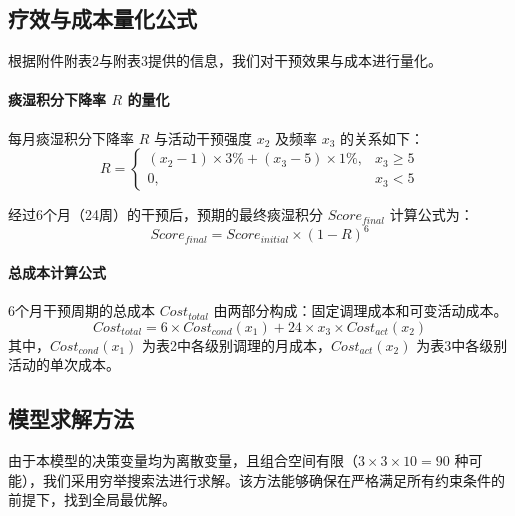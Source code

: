 \documentclass[12pt,a4paper]{article}
\begin{document}
\subsection{疗效与成本量化公式}
根据附件附表2与附表3提供的信息，我们对干预效果与成本进行量化。

\paragraph{痰湿积分下降率 $R$ 的量化}
每月痰湿积分下降率 $R$ 与活动干预强度 $x_2$ 及频率 $x_3$ 的关系如下：
\begin{equation}
R =
\begin{cases}
 (x_2 - 1) \times 3\% + (x_3 - 5) \times 1\%, & x_3 \ge 5 \\
0, & x_3 < 5
\end{cases}
\end{equation}

经过6个月（24周）的干预后，预期的最终痰湿积分 $Score_{final}$ 计算公式为：
\begin{equation}
Score_{final} = Score_{initial} \times (1 - R)^6
\end{equation}

\paragraph{总成本计算公式}
6个月干预周期的总成本 $Cost_{total}$ 由两部分构成：固定调理成本和可变活动成本。
\begin{equation}
Cost_{total} = 6 \times Cost_{cond}(x_1) + 24 \times x_3 \times Cost_{act}(x_2)
\end{equation}
其中，$Cost_{cond}(x_1)$ 为表2中各级别调理的月成本，$Cost_{act}(x_2)$ 为表3中各级别活动的单次成本。

\subsection{模型求解方法}
由于本模型的决策变量均为离散变量，且组合空间有限（$3 \times 3 \times 10 = 90$ 种可能），我们采用穷举搜索法进行求解。该方法能够确保在严格满足所有约束条件的前提下，找到全局最优解。
\end{document}

